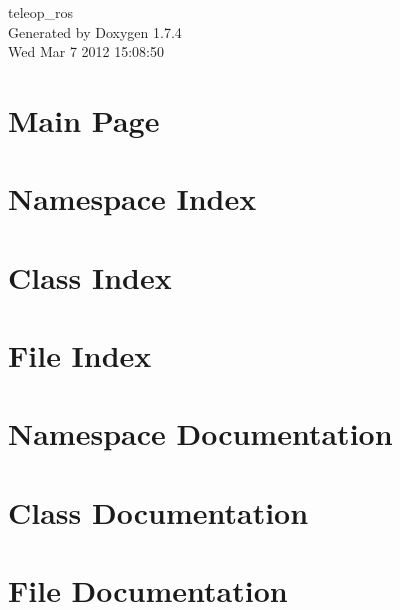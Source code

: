 \documentclass[a4paper]{book}
\begin{document}
\begin{titlepage}
\vspace*{7cm}
\begin{center}
{\Large teleop\_\-ros }\\
\vspace*{1cm}
{\large Generated by Doxygen 1.7.4}\\
\vspace*{0.5cm}
{\small Wed Mar 7 2012 15:08:50}\\
\end{center}
\end{titlepage}
\clearemptydoublepage
{}
\tableofcontents
\clearemptydoublepage
{}
\chapter{Main Page}
\label{index}
\chapter{Namespace Index}

\chapter{Class Index}

\chapter{File Index}

\chapter{Namespace Documentation}

\chapter{Class Documentation}


\chapter{File Documentation}







\printindex
\end{document}
